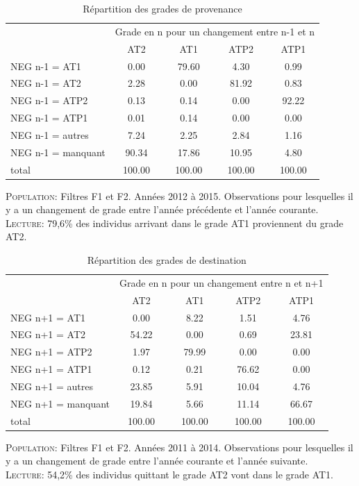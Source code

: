 \documentclass[11pt,a4paper]{article}
\begin{document}
\begin{table}[h!]
\centering
\caption{Répartition des grades de provenance} 
\label{entry}
\begin{tabular}{lcccc}
\toprule
 & \multicolumn{4}{c}{Grade en n pour un changement entre n-1 et n} \\
 & AT2 & AT1 & ATP2 & ATP1 \\ 
  \hline
NEG n-1 = AT1 & 0.00 & 79.60 & 4.30 & 0.99 \\ 
  NEG n-1 = AT2 & 2.28 & 0.00 & 81.92 & 0.83 \\ 
  NEG n-1 = ATP2 & 0.13 & 0.14 & 0.00 & 92.22 \\ 
  NEG n-1 = ATP1 & 0.01 & 0.14 & 0.00 & 0.00 \\ 
  NEG n-1 = autres & 7.24 & 2.25 & 2.84 & 1.16 \\ 
  NEG n-1 = manquant & 90.34 & 17.86 & 10.95 & 4.80 \\ 
  total & 100.00 & 100.00 & 100.00 & 100.00 \\ 
   \hline
\bottomrule
\end{tabular}
\begin{minipage}{12cm}
\footnotesize
\textsc{Population:} Filtres F1 et F2. Années 2012 à 2015. Observations pour lesquelles il y a un changement de grade entre l'année précédente et l'année courante. \\
\textsc{Lecture:} 79,6\% des individus arrivant dans le grade AT1 proviennent du grade AT2.
\end{minipage}
\end{table}

\medskip


\begin{table}[h!]
\centering
\caption{Répartition des grades de destination} 
\label{exit}
\begin{tabular}{lcccc}
\toprule
 & \multicolumn{4}{c}{Grade en n pour un changement entre n et n+1} \\
 & AT2 & AT1 & ATP2 & ATP1 \\ 
  \hline
NEG n+1 = AT1 & 0.00 & 8.22 & 1.51 & 4.76 \\ 
  NEG n+1 = AT2 & 54.22 & 0.00 & 0.69 & 23.81 \\ 
  NEG n+1 = ATP2 & 1.97 & 79.99 & 0.00 & 0.00 \\ 
  NEG n+1 = ATP1 & 0.12 & 0.21 & 76.62 & 0.00 \\ 
  NEG n+1 = autres & 23.85 & 5.91 & 10.04 & 4.76 \\ 
  NEG n+1 = manquant & 19.84 & 5.66 & 11.14 & 66.67 \\ 
  total & 100.00 & 100.00 & 100.00 & 100.00 \\ 
   \hline
\bottomrule
\end{tabular}
\begin{minipage}{12cm}
\footnotesize
\textsc{Population:} Filtres F1 et F2. Années 2011 à 2014. Observations pour lesquelles il y a un changement de grade entre l'année courante et l'année suivante. \\
\textsc{Lecture:} 54,2\% des individus quittant le grade AT2 vont dans le grade AT1.
\end{minipage}
\end{table}
\end{document}
